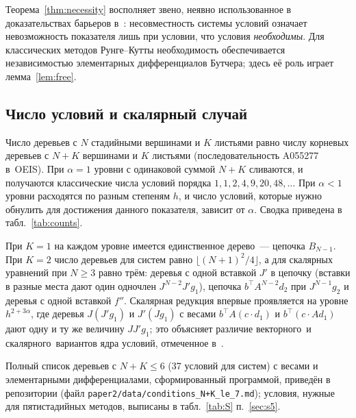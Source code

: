 \begin{remark}
Теорема~\ref{thm:necessity} восполняет звено, неявно использованное в доказательствах барьеров в~\cite{PrikBarriers}: несовместность системы условий означает невозможность показателя лишь при условии, что условия \emph{необходимы}. Для классических методов Рунге--Кутты необходимость обеспечивается независимостью элементарных дифференциалов Бутчера; здесь её роль играет лемма~\ref{lem:free}.
\end{remark}

\subsection{Число условий и скалярный случай}

Число деревьев с $N$ стадийными вершинами и $K$ листьями равно числу корневых деревьев с $N+K$ вершинами и $K$ листьями (последовательность A055277 в~OEIS). При $\alpha=1$ уровни с одинаковой суммой $N+K$ сливаются, и получаются классические числа условий порядка $1,1,2,4,9,20,48,\dots$ При $\alpha<1$ уровни расходятся по разным степеням $h$, и число условий, которые нужно обнулить для достижения данного показателя, зависит от $\alpha$. Сводка приведена в табл.~\ref{tab:counts}.



При $K=1$ на каждом уровне имеется единственное дерево~--- цепочка $B_{N-1}$. При $K=2$ число деревьев для систем равно $\lfloor(N+1)^2/4\rfloor$, а для скалярных уравнений при $N\ge3$ равно трём: деревья с одной вставкой $J'$ в цепочку (вставки в разные места дают один одночлен $J^{N-2}J'g_1$), цепочка $b^{\top}A^{N-2}d_2$ при $J^{N-1}g_2$ и деревья с одной вставкой $f''$. Скалярная редукция впервые проявляется на уровне $h^{2+3\alpha}$, где деревья $J(J'g_1)$ и $J'(Jg_1)$ с весами $b^{\top}A(c\cdot d_1)$ и $b^{\top}(c\cdot Ad_1)$ дают одну и ту же величину $JJ'g_1$; это объясняет различие \guillemotleft векторного\guillemotright\ и \guillemotleft скалярного\guillemotright\ вариантов ядра условий, отмеченное в~\cite{PrikBarriers}.

Полный список деревьев с $N+K\le6$ (37 условий для систем) с весами и элементарными дифференциалами, сформированный программой, приведён в репозитории (файл \texttt{paper2/data/conditions\_N+K\_le\_7.md}); условия, нужные для пятистадийных методов, выписаны в табл.~\ref{tab:S} п.~\ref{sec:s5}.
